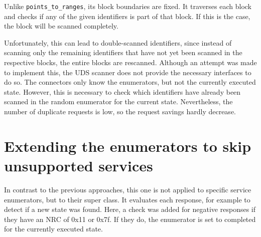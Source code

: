 Unlike \texttt{points_to_ranges}, its block boundaries are fixed. It traverses each block and checks if any of the given identifiers is part of that block. If this is the case, the block will be scanned completely.

Unfortunately, this can lead to double-scanned identifiers, since instead of scanning only the remaining identifiers that have not yet been scanned in the respective blocks, the entire blocks are rescanned. Although an attempt was made to implement this, the UDS scanner does not provide the necessary interfaces to do so. The connectors only know the enumerators, but not the currently executed state. However, this is necessary to check which identifiers have already been scanned in the random enumerator for the current state. Nevertheless, the number of duplicate requests is low, so the request savings hardly decrease.

\section{Extending the enumerators to skip unsupported services}

In contrast to the previous approaches, this one is not applied to specific service enumerators, but to their super class. It evaluates each response, for example to detect if a new state was found. Here, a check was added for negative responses if they have an NRC of 0x11 or 0x7f. If they do, the enumerator is set to completed for the currently executed state.

